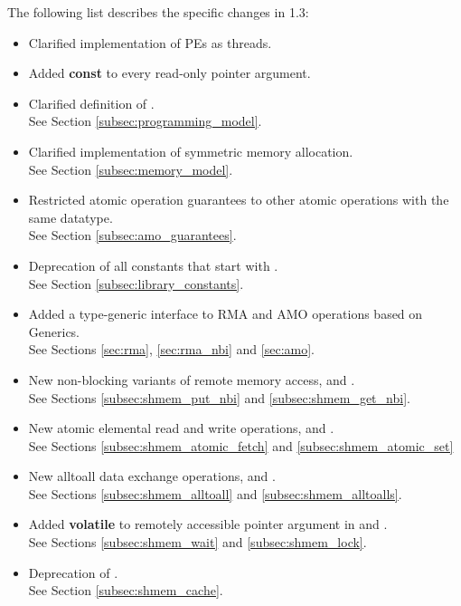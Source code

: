 The following list describes the specific changes in 1.3:

\begin{itemize}
%
\item Clarified implementation of \ac{PE}s as threads.
%
\item Added \textbf{const} to every read-only pointer argument.
%
\item Clarified definition of .
\\See Section \ref{subsec:programming_model}.
%
\item Clarified implementation of symmetric memory allocation.
\\See Section \ref{subsec:memory_model}.
%
\item Restricted atomic operation guarantees to other atomic operations with the same datatype.
\\See Section \ref{subsec:amo_guarantees}.
%
\item Deprecation of all constants that start with .
\\See Section \ref{subsec:library_constants}.
%
\item Added a type-generic interface to \openshmem \ac{RMA} and \ac{AMO}
	operations based on \Cstd[11] Generics.
\\See Sections \ref{sec:rma}, \ref{sec:rma_nbi} and \ref{sec:amo}.
%
\item New non-blocking variants of remote memory access, 
	and .
\\See Sections \ref{subsec:shmem_put_nbi} and \ref{subsec:shmem_get_nbi}.
%
\item New atomic elemental read and write operations,  and
	.
\\See Sections \ref{subsec:shmem_atomic_fetch} and \ref{subsec:shmem_atomic_set}
%
\item New alltoall data exchange operations,  
	and .
\\See Sections \ref{subsec:shmem_alltoall} and \ref{subsec:shmem_alltoalls}.
%
\item Added \textbf{volatile} to remotely accessible pointer argument in 
	 and .
\\See Sections \ref{subsec:shmem_wait} and \ref{subsec:shmem_lock}.
%
\item Deprecation of .
\\See Section \ref{subsec:shmem_cache}.
%
\end{itemize}




